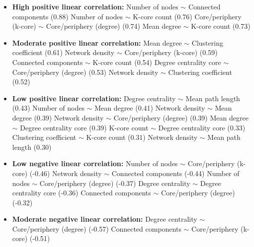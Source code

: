 \begin{itemize}
    \item \textbf{High positive linear correlation:} 
    \newline Number of nodes $\sim$ Connected components (0.88)
    \newline Number of nodes $\sim$ K-core count (0.76)
    \newline Core/periphery (k-core) $\sim$ Core/periphery (degree) (0.74)
    \newline Mean degree $\sim$ K-core count (0.73) 
    \item \textbf{Moderate positive linear correlation:}
    \newline Mean degree $\sim$ Clustering coefficient (0.61)
    \newline Network density $\sim$ Core/periphery (k-core) (0.59)
    \newline Connected components $\sim$ K-core count (0.54)
    \newline Degree centrality core $\sim$ Core/periphery (degree) (0.53)
    \newline Network density $\sim$ Clustering coefficient (0.52)
    \item \textbf{Low positive linear correlation:}
    \newline Degree centrality $\sim$ Mean path length (0.43)
    \newline Number of nodes $\sim$ Mean degree (0.41)
    \newline Network density $\sim$ Mean degree (0.39)
    \newline Network density $\sim$ Core/periphery (degree) (0.39)
    \newline Mean degree $\sim$ Degree centrality core (0.39)
    \newline K-core count $\sim$ Degree centrality core (0.33)
    \newline Clustering coefficient $\sim$ K-core count (0.31)
    \newline Network density $\sim$ Mean path length (0.30)
    \item \textbf{Low negative linear correlation:}
    \newline Number of nodes $\sim$ Core/periphery (k-core) (-0.46)
    \newline Network density $\sim$ Connected components (-0.44)
    \newline Number of nodes $\sim$ Core/periphery (degree) (-0.37)
    \newline Degree centrality $\sim$ Degree centrality core (-0.36)
    \newline Connected components $\sim$ Core/periphery (degree) (-0.32)
    \item \textbf{Moderate negative linear correlation:}
    \newline Degree centrality $\sim$ Core/periphery (degree) (-0.57)
    \newline Connected components $\sim$ Core/periphery (k-core) (-0.51)
\end{itemize}

